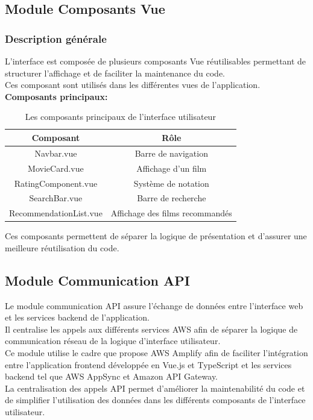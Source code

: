 \documentclass[a4paper,12pt]{report}
\begin{document}
\subsection{Module Composants Vue}
\label{cv}
\subsubsection{Description générale}
L’interface est composée de plusieurs composants Vue réutilisables permettant de structurer l’affichage et de faciliter la maintenance du code.\\
Ces composant sont utilisés dans les différentes vues de l’application.\\
\textbf{Composants principaux:}\\

\begin{table}[h]
    \centering
    \begin{tabular}{c|c}
    \hline
    Composant & Rôle \\ \hline
    Navbar.vue & Barre de navigation  \\ \hline
    MovieCard.vue & Affichage d’un film \\ \hline
    RatingComponent.vue & Système de notation \\ \hline
    SearchBar.vue & Barre de recherche \\ \hline
    RecommendationList.vue & Affichage des films recommandés \\ \hline
                     
    \end{tabular}
    \caption{Les composants principaux de l'interface utilisateur}
\end{table}
Ces composants permettent de séparer la logique de présentation et d’assurer une meilleure réutilisation du code.

\subsection{Module Communication API}
\label{ts}
Le module communication API assure l'échange de données entre l'interface web et les services backend de l'application.\\
Il centralise les appels aux différents services AWS afin de séparer la logique de communication réseau de la logique d'interface utilisateur.\\
Ce module utilise le cadre que propose AWS Amplify afin de faciliter l'intégration entre l'application frontend développée en Vue.js et TypeScript et les services backend tel que AWS AppSync et Amazon API Gateway.\\
La centralisation des appels API permet d'améliorer la maintenabilité du code et de simplifier l'utilisation des données dans les différents composants de l'interface utilisateur.\\
\end{document}
